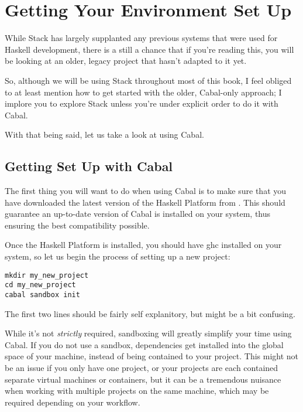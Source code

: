 \section{Getting Your Environment Set Up}

While Stack has largely supplanted any previous systems that were used for Haskell development, there is a still a chance that if you're reading this, you will be looking at an older, legacy project that hasn't adapted to it yet. 

So, although we will be using Stack throughout most of this book, I feel obliged to at least mention how to get started with the older, Cabal-only approach; I implore you to explore Stack unless you're under explicit order to do it with Cabal.

With that being said, let us take a look at using Cabal. 

\subsection{Getting Set Up with Cabal}

The first thing you will want to do when using Cabal is to make sure that you have downloaded the latest version of the Haskell Platform from .  This should guarantee an up-to-date version of Cabal is installed on your system, thus ensuring the best compatibility possible. 

Once the Haskell Platform is installed, you should have ghc installed on your system, so let us begin the process of setting up a new project: 

\begin{verbatim}
mkdir my_new_project
cd my_new_project
cabal sandbox init
\end{verbatim}

The first two lines should be fairly self explanitory, but  might be a bit confusing. 

While it's not \textit{strictly} required, sandboxing will greatly simplify your time using Cabal.  If you do not use a sandbox, dependencies get installed into the global space of your machine, instead of being contained to your project.  This might not be an issue if you only have one project, or your projects are each contained separate virtual machines or containers, but it can be a tremendous nuisance when working with multiple projects on the same machine, which may be required depending on your workflow. 

